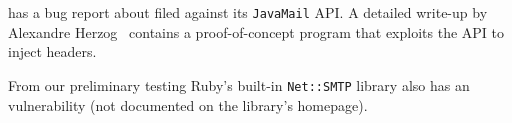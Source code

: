 %

 has a bug report about \ehi filed against its \texttt{JavaMail} API. A detailed write-up by Alexandre Herzog~\cite{Herzog.2014} contains a proof-of-concept program that exploits the API to inject headers.

\begin{sloppypar}
From our preliminary testing Ruby's built-in \texttt{Net::SMTP} library also has an \ehi vulnerability (not documented on the library's homepage).
\end{sloppypar}
%


